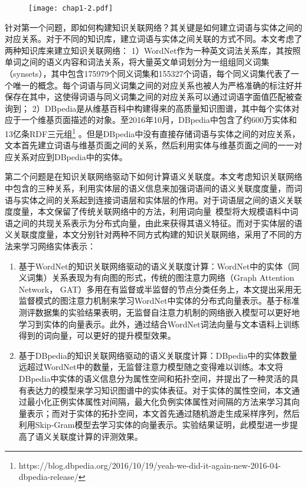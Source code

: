 \begin{figure}
    \centerline{\texttt{[image: chap1-2.pdf]}}
    \label{chap1-2}
\end{figure}

针对第一个问题，即如何构建知识关联网络？其关键是如何建立词语与实体之间的对应关系。对于不同的知识库，建立词语与实体之间关联的方式不同。本文考虑了两种知识库来建立知识关联网络：
1）WordNet作为一种英文词法关系库，其按照单词之间的语义内容和词法关系，将大量英文单词划分为一组组同义词集（synsets），其中包含175979个同义词集和155327个词语，每个同义词集代表了一个唯一的概念。每个词语与同义词集之间的对应关系也被人为严格准确的标注好并保存在其中，这使得词语与同义词集之间的对应关系可以通过词语字面值匹配被查询到；
2）DBpedia是从维基百科中构建得来的高质量知识图谱，其中每个实体对应于一个维基页面描述的对象。至2016年10月，DBpedia中包含了约600万实体和13亿条RDF三元组\footnote{https://blog.dbpedia.org/2016/10/19/yeah-we-did-it-again-new-2016-04-dbpedia-release/} 。但是DBpedia中没有直接存储词语与实体之间的对应关系，文本首先建立词语与维基页面之间的关系，然后利用实体与维基页面之间的一一对应关系对应到DBpedia中的实体。

第二个问题是在知识关联网络驱动下如何计算语义关联度。本文考虑知识关联网络中包含的三种关系，利用实体层的语义信息来加强词语间的语义关联度度量，而词语与实体之间的关系起到连接词语层和实体层的作用。对于词语层之间的语义关联度度量，本文保留了传统关联网络中的方法，利用词向量~\cite{corr/Mikolov13, emnlp/PenningtonSM14}模型将大规模语料中词语之间的共现关系表示为分布式向量，由此来获得其语义特征。而对于实体层的语义关联度度量，本文分别针对两种不同方式构建的知识关联网络，采用了不同的方法来学习网络实体表示：
\begin{enumerate}
    \item 基于WordNet的知识关联网络驱动的语义关联度计算：WordNet中的实体（同义词集）关系表现为有向图的形式，传统的图注意力网络（Graph Attention Network， GAT）\cite{iclr/VelickovicCCRLB18}多用在有监督或半监督的节点分类任务上，本文提出采用无监督模式的图注意力机制来学习WordNet中实体的分布式向量表示。基于标准测评数据集的实验结果表明，无监督自注意力机制的网络嵌入模型可以更好地学习到实体的向量表示。此外，通过结合WordNet词法向量与文本语料上训练得到的词向量，可以更好的提升模型效果。
    \item 基于DBpedia的知识关联网络驱动的语义关联度计算：DBpedia中的实体数量远超过WordNet中的数量，无监督注意力模型随之变得难以训练。本文将DBpedia中实体的语义信息分为属性空间和拓扑空间，并提出了一种灵活的具有表达力的模型来学习知识图谱中的实体表征。对于实体的属性空间，本文通过最小化正例实体属性对间隔，最大化负例实体属性对间隔的方法来学习其向量表示；而对于实体的拓扑空间，本文首先通过随机游走生成采样序列，然后利用Skip-Gram\cite{corr/Mikolov13}模型去学习实体的向量表示。实验结果证明，此模型进一步提高了语义关联度计算的评测效果。
\end{enumerate}

